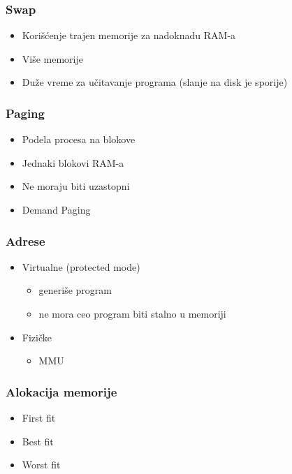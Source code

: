 \documentclass{beamer}
\begin{document}
\begin{frame}
    \frametitle{Swap}
    \begin{itemize}
        \item Korišćenje trajen memorije za nadoknadu RAM-a \newline
        \item Više memorije \newline
        \item Duže vreme za učitavanje programa (slanje na disk je sporije)
    \end{itemize}
\end{frame}

\begin{frame}
    \frametitle{Paging}
    \begin{itemize}
        \item Podela procesa na blokove \newline
        \item Jednaki blokovi RAM-a \newline
        \item Ne moraju biti uzastopni \newline
        \item Demand Paging
    \end{itemize}
\end{frame}

\begin{frame}
    \frametitle{Adrese}
    \begin{itemize}
        \item Virtualne (protected mode) \begin{itemize}
            \item generiše program \newline
            \item ne mora ceo program biti stalno u memoriji \newline
        \end{itemize}
        \item Fizičke \begin{itemize}
            \item MMU
        \end{itemize}
    \end{itemize}
\end{frame}

\begin{frame}
    \frametitle{Alokacija memorije}
    \begin{itemize}
        \item First fit \newline
        \item Best fit \newline
        \item Worst fit
    \end{itemize}
\end{frame}
\end{document}

